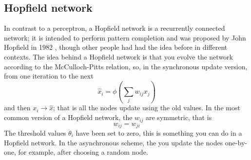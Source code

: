 \documentclass[12pt]{article}
\begin{document}
\subsection*{Hopfield network}

In contrast to a perceptron, a Hopfield network is a recurrently
connected network; it is intended to perform pattern completion and
was proposed by John Hopfield in 1982 \cite{Hopfield1982}, though other people had had the
idea before in different contexts. The idea behind a Hopfield network
is that you evolve the network according to the McCulloch-Pitts
relation, so, in the synchronous update version, from one iteration to
the next
\begin{equation}
\hat{x}_i=\phi\left(\sum_j w_{ij} x_j\right)
\end{equation}
and then $x_i\rightarrow \hat{x}$; that is all the nodes update using
the old values. In the most common version of a Hopfield network, the $w_{ij}$ are symmetric, that is
\begin{equation}
w_{ij}=w_{ji}
\end{equation}
The threshold values $\theta_i$ have been set to zero, this is
something you can do in a Hopfield network. In the asynchronous
scheme, the you update the nodes one-by-one, for example, after
choosing a random node.
\end{document}
